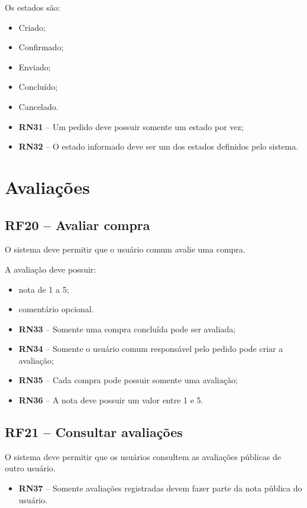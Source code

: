 \documentclass{scrreprt}
\newenvironment{fieldlist}
	{\renewcommand{\labelitemi}{--}\begin{itemize}}
	{\end{itemize}}
\begin{document}
Os estados são:
\begin{fieldlist}
	\item Criado;
	\item Confirmado;
	\item Enviado;
	\item Concluído;
	\item Cancelado.
\end{fieldlist}

\begin{itemize}
	\item \textbf{RN31} -- Um pedido deve possuir somente um estado por vez;
	\item \textbf{RN32} -- O estado informado deve ser um dos estados definidos pelo sistema.
\end{itemize}

\section{Avaliações}

\subsection{RF20 -- Avaliar compra}
O sistema deve permitir que o usuário comum avalie uma compra.

A avaliação deve possuir:
\begin{fieldlist}
	\item nota de 1 a 5;
	\item comentário opcional.
\end{fieldlist}

\begin{itemize}
	\item \textbf{RN33} -- Somente uma compra concluída pode ser avaliada;
	\item \textbf{RN34} -- Somente o usuário comum responsável pelo pedido pode criar a avaliação;
	\item \textbf{RN35} -- Cada compra pode possuir somente uma avaliação;
	\item \textbf{RN36} -- A nota deve possuir um valor entre 1 e 5.
\end{itemize}

\subsection{RF21 -- Consultar avaliações}
O sistema deve permitir que os usuários consultem as avaliações públicas de outro usuário.
\begin{itemize}
	\item \textbf{RN37} -- Somente avaliações registradas devem fazer parte da nota pública do usuário.
\end{itemize}
\end{document}
